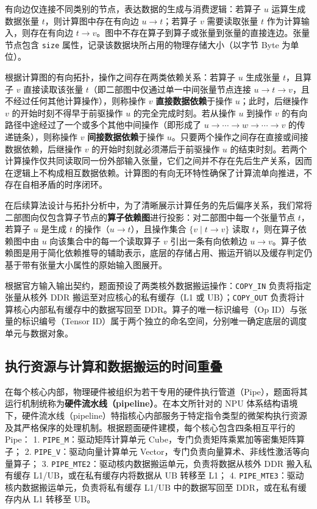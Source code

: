 \documentclass[anonymous,notoc]{gmcm2026}
\begin{document}
有向边仅连接不同类别的节点，表达数据的生成与消费逻辑：若算子 \(u\) 运算生成数据张量 \(t\)，则计算图中存在有向边 \(u \to t\)；若算子 \(v\) 需要读取张量 \(t\) 作为计算输入，则存在有向边 \(t \to v\)。图中不存在算子到算子或张量到张量的直接连边。张量节点包含 \texttt{size} 属性，记录该数据块所占用的物理存储大小（以字节 Byte 为单位）。

根据计算图的有向拓扑，操作之间存在两类依赖关系：若算子 \(u\) 生成张量 \(t\)，且算子 \(v\) 直接读取该张量 \(t\)（即二部图中仅通过单一中间张量节点连接 \(u \to t \to v\)，且不经过任何其他计算操作），则称操作 \(v\) \textbf{直接数据依赖}于操作 \(u\)；此时，后继操作 \(v\) 的开始时刻不得早于前驱操作 \(u\) 的完全完成时刻。若从操作 \(u\) 到操作 \(v\) 的有向路径中途经过了一个或多个其他中间操作（即形成了 \(u \to \cdots \to w \to \cdots \to v\) 的传递链条），则称操作 \(v\) \textbf{间接数据依赖}于操作 \(u\)。只要两个操作之间存在直接或间接数据依赖，后继操作 \(v\) 的开始时刻就必须滞后于前驱操作 \(u\) 的结束时刻。若两个计算操作仅共同读取同一份外部输入张量，它们之间并不存在先后生产关系，因而在逻辑上不构成相互数据依赖。计算图的有向无环特性确保了计算流单向推进，不存在自相矛盾的时序闭环。

在后续算法设计与拓扑分析中，为了清晰展示计算任务的先后偏序关系，我们常将二部图向仅包含算子节点的\textbf{算子依赖图}进行投影：对二部图中每一个张量节点 \(t\)，若算子 \(u\) 是生成 \(t\) 的操作（\(u \to t\)），且操作集合 \(\{v \mid t \to v\}\) 读取 \(t\)，则在算子依赖图中由 \(u\) 向该集合中的每一个读取算子 \(v\) 引出一条有向依赖边 \(u \to v\)。算子依赖图是用于简化依赖推导的辅助表示，底层的存储占用、搬运开销以及缓存判定仍基于带有张量大小属性的原始输入图展开。

根据官方输入输出契约，题面预设了两类核外数据搬运操作：\texttt{COPY\_IN} 负责将指定张量从核外 DDR 搬运至对应核心的私有缓存（L1 或 UB）；\texttt{COPY\_OUT} 负责将计算核心内部私有缓存中的数据写回至 DDR。算子的唯一标识编号（Op ID）与张量的标识编号（Tensor ID）属于两个独立的命名空间，分别唯一确定底层的调度单元与数据对象。

\subsection{执行资源与计算和数据搬运的时间重叠}

在每个核心内部，物理硬件被组织为若干专用的硬件执行管道（Pipe），题面将其运行机制统称为\textbf{硬件流水线（pipeline）}。在本文所针对的 NPU 体系结构语境下，硬件流水线（pipeline）特指核心内部服务于特定指令类型的微架构执行资源及其严格保序的处理机制。根据题面硬件建模，每个核心包含四条相互平行的 Pipe： 1. \texttt{PIPE\_M}：驱动矩阵计算单元 Cube，专门负责矩阵乘累加等密集矩阵算子； 2. \texttt{PIPE\_V}：驱动向量计算单元 Vector，专门负责向量算术、非线性激活等向量算子； 3. \texttt{PIPE\_MTE2}：驱动核内数据搬运单元，负责将数据从核外 DDR 搬入私有缓存 L1/UB，或在私有缓存内将数据从 UB 转移至 L1； 4. \texttt{PIPE\_MTE3}：驱动核内数据搬运单元，负责将私有缓存 L1/UB 中的数据写回至 DDR，或在私有缓存内从 L1 转移至 UB。
\end{document}
